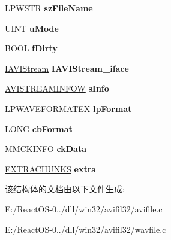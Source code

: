 \begin{DoxyCompactItemize}
\mbox{\label{struct___i_a_v_i_file_impl_a43e01789ffe0093044eba9d8d7789219}} 
L\+P\+W\+S\+TR {\bfseries sz\+File\+Name}
\item 
\mbox{\label{struct___i_a_v_i_file_impl_a6d73f080c481e6e11ff03c45e471d2b0}} 
U\+I\+NT {\bfseries u\+Mode}
\item 
\mbox{\label{struct___i_a_v_i_file_impl_ad61bab17b8c6485cf8b2b812ee01c7fd}} 
B\+O\+OL {\bfseries f\+Dirty}
\item 
\mbox{\label{struct___i_a_v_i_file_impl_acbd6f353b25f773d138526bd8f398310}} 
\hyperlink{interface_i_a_v_i_stream}{I\+A\+V\+I\+Stream} {\bfseries I\+A\+V\+I\+Stream\+\_\+iface}
\item 
\mbox{\label{struct___i_a_v_i_file_impl_a8bb5afba860350ce073760d428ff48d6}} 
\hyperlink{struct___a_v_i_s_t_r_e_a_m_i_n_f_o_w}{A\+V\+I\+S\+T\+R\+E\+A\+M\+I\+N\+F\+OW} {\bfseries s\+Info}
\item 
\mbox{\label{struct___i_a_v_i_file_impl_a4cf6cc57eec48c5e19f8ac60ab74de71}} 
\hyperlink{struct___w_a_v_e_f_o_r_m_a_t_e_x}{L\+P\+W\+A\+V\+E\+F\+O\+R\+M\+A\+T\+EX} {\bfseries lp\+Format}
\item 
\mbox{\label{struct___i_a_v_i_file_impl_a0d585e87f1f01643be6e258496cf755c}} 
L\+O\+NG {\bfseries cb\+Format}
\item 
\mbox{\label{struct___i_a_v_i_file_impl_a2ab1b54e5e8640912d5c5d0d780dc7a8}} 
\hyperlink{struct___m_m_c_k_i_n_f_o}{M\+M\+C\+K\+I\+N\+FO} {\bfseries ck\+Data}
\item 
\mbox{\label{struct___i_a_v_i_file_impl_ae0afd7383cc5197350ff6a4714ce7ee4}} 
\hyperlink{struct___e_x_t_r_a_c_h_u_n_k_s}{E\+X\+T\+R\+A\+C\+H\+U\+N\+KS} {\bfseries extra}
\end{DoxyCompactItemize}


该结构体的文档由以下文件生成\+:\begin{DoxyCompactItemize}
\item 
E\+:/\+React\+O\+S-\/0../dll/win32/avifil32/avifile.\+c\item 
E\+:/\+React\+O\+S-\/0../dll/win32/avifil32/wavfile.\+c\end{DoxyCompactItemize}
